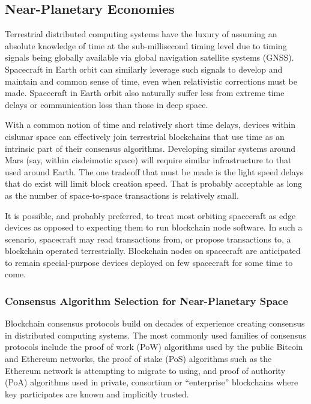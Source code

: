 \documentclass[]{aiaa-tc}%
\begin{document}
\subsection{Near-Planetary Economies}

Terrestrial distributed computing systems have the luxury of assuming an absolute knowledge of time at the sub-millisecond timing level due to timing signals being globally available via global navigation satellite systems (GNSS). Spacecraft in Earth orbit can similarly leverage such signals to develop and maintain and common sense of time, even when relativistic corrections must be made. Spacecraft in Earth orbit also naturally suffer less from extreme time delays or communication loss than those in deep space. 

With a common notion of time and relatively short time delays, devices within cislunar space can effectively join terrestrial blockchains that use time as an intrinsic part of their consensus algorithms. Developing similar systems around Mars (say, within cisdeimotic space) will require similar infrastructure to that used around Earth. The one tradeoff that must be made is the light speed delays that do exist will limit block creation speed. That is probably acceptable as long as the number of space-to-space transactions is relatively small. 

It is possible, and probably preferred, to treat most orbiting spacecraft as edge devices as opposed to expecting them to run blockchain node software. In such a scenario, spacecraft may read transactions from, or propose transactions to, a blockchain operated terrestrially. Blockchain nodes on spacecraft are anticipated to remain special-purpose devices deployed on few spacecraft for some time to come.

\subsubsection{Consensus Algorithm Selection for Near-Planetary Space}

Blockchain consensus protocols build on decades of experience creating consensus in distributed computing systems. The most commonly used families of consensus protocols include the proof of work (PoW) algorithms used by the public Bitcoin and Ethereum networks, the proof of stake (PoS) algorithms such as the Ethereum network is attempting to migrate to using, and proof of authority (PoA) algorithms used in private, consortium or ``enterprise'' blockchains where key participates are known and implicitly trusted.
\end{document}
